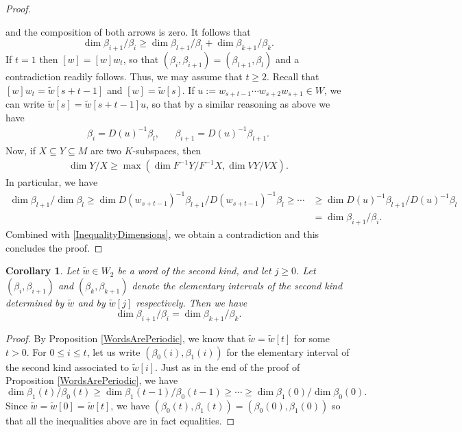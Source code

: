 \documentclass[12pt]{amsart}
\newtheorem{corollary}[theorem]{Corollary}
\theoremstyle{definition}
\renewcommand{\tilde}{\widetilde}
\newcommand{\<}{\langle}   %
\renewcommand{\>}{\rangle} %
\begin{document}
\begin{proof}
\begin{center}
\begin{tikzcd}
        \end{tikzcd}
    \end{center}
    and the composition of both arrows is zero. It follows that 
    \begin{equation}\label{InequalityDimensions}
        \dim \beta_{i+1}/\beta_i \geq \dim \beta_{l+1}/\beta_l + \dim \beta_{k+1}/\beta_k.
    \end{equation}
    If $t=1$ then $[w] = [w]w_t$, so that $(\beta_i,\beta_{i+1}) = (\beta_{l+1},\beta_l)$ and a contradiction readily follows. Thus, we may assume that $t\geq 2$. Recall that $[w]w_t = \tilde w[s+t-1]$ and $[w] = \tilde w[s]$. If $u := w_{s+t-1}\cdots w_{s+2}w_{s+1} \in W$, we can write 
    $\tilde w[s] = \tilde w[s+t-1]u$, so that by a similar reasoning as above we have 
    \begin{align*}
        \beta_i = D(u)^{-1}\beta_l, & & \beta_{i+1} = D(u)^{-1}\beta_{l+1}.
    \end{align*}
    Now, if $X\subseteq  Y \subseteq  M$ are two $K$-subspaces, then
    \begin{align*}
        \dim Y/X \geq \max(\dim F^{-1}Y/F^{-1}X, \dim VY/VX).
    \end{align*}
    In particular, we have 
    \begin{align*}
        \dim \beta_{l+1}/\dim \beta_l \geq \dim D(w_{s+t-1})^{-1}\beta_{l+1}/D(w_{s+t-1})^{-1}\beta_{l} \geq \cdots & \geq \dim D(u)^{-1}\beta_{l+1}/D(u)^{-1}\beta_l \\
        & = \dim \beta_{i+1}/\beta_i.
    \end{align*}
    Combined with \eqref{InequalityDimensions}, we obtain a contradiction and this concludes the proof.
    \end{proof}

\begin{corollary}\label{CorollaryAllInervalsSecondKindSameLength}
    Let $\tilde w \in W_2$ be a word of the second kind, and let $j \geq 0$. Let $(\beta_i,\beta_{i+1})$ and $(\beta_k,\beta_{k+1})$ denote the elementary intervals of the second kind determined by $\tilde w$ and by $\tilde w[j]$ respectively. Then we have
    \begin{equation*}
        \dim \beta_{i+1}/\beta_i = \dim \beta_{k+1}/\beta_k.
    \end{equation*}
\end{corollary}

\begin{proof}
    By Proposition \ref{WordsArePeriodic}, we know that $\tilde w = \tilde w[t]$ for some $t > 0$. For $0 \leq i \leq t$, let us write $(\beta_0(i),\beta_1(i))$ for the elementary interval of the second kind associated to $\tilde w[i]$. Just as in the end of the proof of Proposition \ref{WordsArePeriodic}, we have 
    \begin{equation*}
        \dim \beta_1(t)/\beta_0(t) \geq \dim \beta_1(t-1)/\beta_0(t-1) \geq \cdots \geq \dim \beta_1(0) / \dim \beta_0(0).
    \end{equation*}
    Since $\tilde w = \tilde w[0] = \tilde w[t]$, we have $(\beta_0(t),\beta_1(t)) = (\beta_0(0),\beta_1(0))$ so that all the inequalities above are in fact equalities.
\end{proof}
\end{document}
